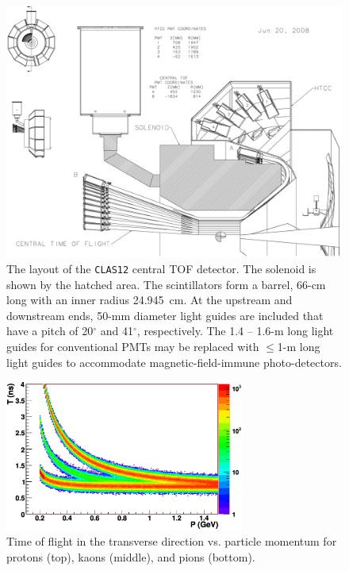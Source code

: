 \begin{figure}[htbp]
\centering
\includegraphics[width=.98\textwidth]{HTCC_CTOF_STUDY_060507_WRAP.eps}
\caption{\small{The layout of the {\tt CLAS12} central TOF detector.  
The solenoid is shown by the hatched area.  The scintillators form a barrel, 
66-cm long with an inner radius 24.945~cm.  At the upstream and downstream
ends, 50-mm diameter light guides are included that have a pitch of 
20$^\circ$ and 41$^\circ$, respectively.  The 1.4 -- 1.6-m long light guides 
for conventional PMTs may be replaced with $\leq$1-m long light guides to 
accommodate magnetic-field-immune photo-detectors.}}
\label{barrel2}
\end{figure}

\begin{figure}[htbp]
\centering
\includegraphics[width=0.7\textwidth]{ctof90deg.eps}
\caption{\small{Time of flight in the transverse direction vs. particle 
momentum for protons (top), kaons (middle), and pions (bottom).}}
\label{ctof_timing}
\end{figure}

